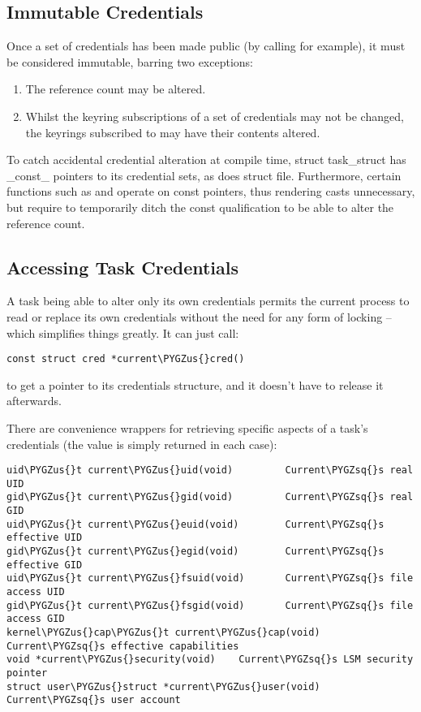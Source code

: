 \documentclass[a4paper,8pt,english]{sphinxmanual}
\def\PYGZus{\char`\_}
\def\PYGZsq{\char`\'}
\renewcommand\PYGZsq{\textquotesingle}
\begin{document}
\subsection{Immutable Credentials}
\label{security/credentials:immutable-credentials}
Once a set of credentials has been made public (by calling 
for example), it must be considered immutable, barring two exceptions:
\begin{enumerate}
\item {} 
The reference count may be altered.

\item {} 
Whilst the keyring subscriptions of a set of credentials may not be
changed, the keyrings subscribed to may have their contents altered.

\end{enumerate}

To catch accidental credential alteration at compile time, struct task\_struct
has \_const\_ pointers to its credential sets, as does struct file.  Furthermore,
certain functions such as  and  operate on const
pointers, thus rendering casts unnecessary, but require to temporarily ditch
the const qualification to be able to alter the reference count.


\subsection{Accessing Task Credentials}
\label{security/credentials:accessing-task-credentials}
A task being able to alter only its own credentials permits the current process
to read or replace its own credentials without the need for any form of locking
-- which simplifies things greatly.  It can just call:

\begin{Verbatim}[commandchars=\\\{\}]
const struct cred *current\PYGZus{}cred()
\end{Verbatim}

to get a pointer to its credentials structure, and it doesn't have to release
it afterwards.

There are convenience wrappers for retrieving specific aspects of a task's
credentials (the value is simply returned in each case):

\begin{Verbatim}[commandchars=\\\{\}]
uid\PYGZus{}t current\PYGZus{}uid(void)         Current\PYGZsq{}s real UID
gid\PYGZus{}t current\PYGZus{}gid(void)         Current\PYGZsq{}s real GID
uid\PYGZus{}t current\PYGZus{}euid(void)        Current\PYGZsq{}s effective UID
gid\PYGZus{}t current\PYGZus{}egid(void)        Current\PYGZsq{}s effective GID
uid\PYGZus{}t current\PYGZus{}fsuid(void)       Current\PYGZsq{}s file access UID
gid\PYGZus{}t current\PYGZus{}fsgid(void)       Current\PYGZsq{}s file access GID
kernel\PYGZus{}cap\PYGZus{}t current\PYGZus{}cap(void)  Current\PYGZsq{}s effective capabilities
void *current\PYGZus{}security(void)    Current\PYGZsq{}s LSM security pointer
struct user\PYGZus{}struct *current\PYGZus{}user(void)  Current\PYGZsq{}s user account
\end{Verbatim}
\end{document}
